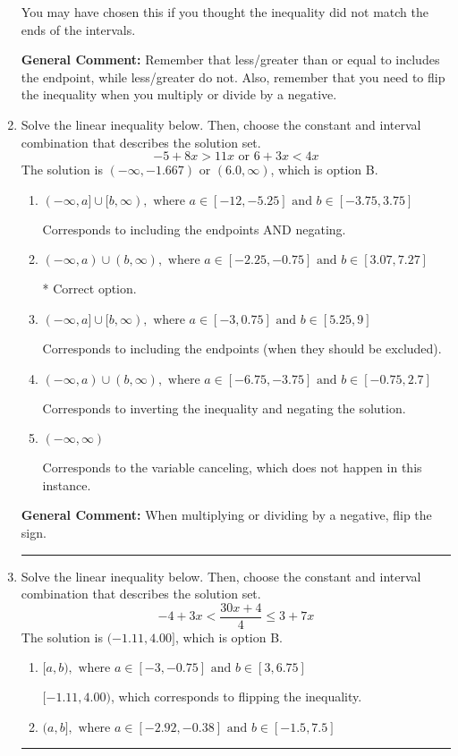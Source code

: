 \documentclass{extbook}[14pt]
\newcommand{\litem}[1]{\item #1

\rule{\textwidth}{0.4pt}}
\begin{document}
\begin{enumerate}
{\begin{enumerate}[label=\Alph*.]
You may have chosen this if you thought the inequality did not match the ends of the intervals.
\end{enumerate}

\textbf{General Comment:} Remember that less/greater than or equal to includes the endpoint, while less/greater do not. Also, remember that you need to flip the inequality when you multiply or divide by a negative.
}
\litem{
Solve the linear inequality below. Then, choose the constant and interval combination that describes the solution set.
\[ -5 + 8 x > 11 x \text{ or } 6 + 3 x < 4 x \]The solution is \( (-\infty, -1.667) \text{ or } (6.0, \infty) \), which is option B.\begin{enumerate}[label=\Alph*.]
\item \( (-\infty, a] \cup [b, \infty), \text{ where } a \in [-12, -5.25] \text{ and } b \in [-3.75, 3.75] \)

Corresponds to including the endpoints AND negating.
\item \( (-\infty, a) \cup (b, \infty), \text{ where } a \in [-2.25, -0.75] \text{ and } b \in [3.07, 7.27] \)

 * Correct option.
\item \( (-\infty, a] \cup [b, \infty), \text{ where } a \in [-3, 0.75] \text{ and } b \in [5.25, 9] \)

Corresponds to including the endpoints (when they should be excluded).
\item \( (-\infty, a) \cup (b, \infty), \text{ where } a \in [-6.75, -3.75] \text{ and } b \in [-0.75, 2.7] \)

Corresponds to inverting the inequality and negating the solution.
\item \( (-\infty, \infty) \)

Corresponds to the variable canceling, which does not happen in this instance.
\end{enumerate}

\textbf{General Comment:} When multiplying or dividing by a negative, flip the sign.
}
\litem{
Solve the linear inequality below. Then, choose the constant and interval combination that describes the solution set.
\[ -4 + 3 x < \frac{30 x + 4}{4} \leq 3 + 7 x \]The solution is \( (-1.11, 4.00] \), which is option B.\begin{enumerate}[label=\Alph*.]
\item \( [a, b), \text{ where } a \in [-3, -0.75] \text{ and } b \in [3, 6.75] \)

$[-1.11, 4.00)$, which corresponds to flipping the inequality.
\item \( (a, b], \text{ where } a \in [-2.92, -0.38] \text{ and } b \in [-1.5, 7.5] \)


\end{enumerate}}
\end{enumerate}
\end{document}
